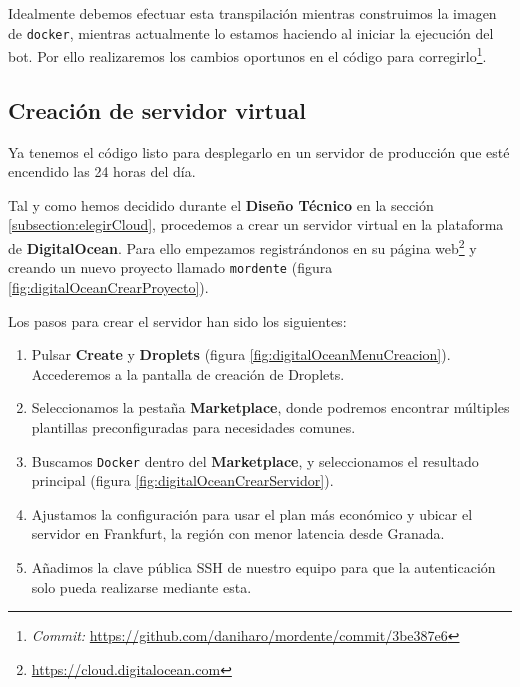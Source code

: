 Idealmente debemos efectuar esta transpilación mientras construimos la imagen de \texttt{docker}, mientras actualmente lo estamos haciendo al iniciar la ejecución del bot. Por ello realizaremos los cambios oportunos en el código para corregirlo\footnote{\textit{Commit:} \url{https://github.com/daniharo/mordente/commit/3be387e6}}.


\subsection{Creación de servidor virtual}

Ya tenemos el código listo para desplegarlo en un servidor de producción que esté encendido las 24 horas del día.

Tal y como hemos decidido durante el \textbf{Diseño Técnico} en la sección \ref{subsection:elegirCloud}, procedemos a crear un servidor virtual en la plataforma de \textbf{DigitalOcean}. Para ello empezamos registrándonos en su página web\footnote{\url{https://cloud.digitalocean.com}} y creando un nuevo proyecto llamado \texttt{mordente} (figura \ref{fig:digitalOceanCrearProyecto}).

Los pasos para crear el servidor han sido los siguientes:

\begin{enumerate}
    \item Pulsar \textbf{Create} y \textbf{Droplets} (figura \ref{fig:digitalOceanMenuCreacion}). Accederemos a la pantalla de creación de Droplets.
    \item Seleccionamos la pestaña \textbf{Marketplace}, donde podremos encontrar múltiples plantillas preconfiguradas para necesidades comunes.
    \item Buscamos \texttt{Docker} dentro del \textbf{Marketplace}, y seleccionamos el resultado principal (figura \ref{fig:digitalOceanCrearServidor}).
    \item Ajustamos la configuración para usar el plan más económico y ubicar el servidor en Frankfurt, la región con menor latencia desde Granada.
    \item Añadimos la clave pública SSH de nuestro equipo para que la autenticación solo pueda realizarse mediante esta.
\end{enumerate}

